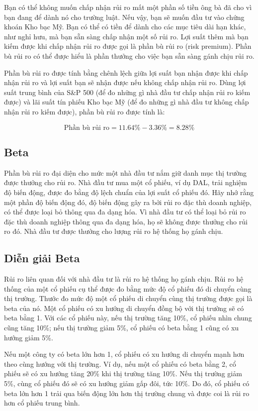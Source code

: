 Bạn có thể không muốn chấp nhận rủi ro mất một phần số tiền ông bà đã cho vì bạn đang để dành nó cho trường luật. Nếu vậy, bạn sẽ muốn đầu tư vào chứng khoán Kho bạc Mỹ. Bạn có thể có tiền để dành cho các mục tiêu dài hạn khác, như nghỉ hưu, mà bạn sẵn sàng chấp nhận một số rủi ro. Lợi suất thêm mà bạn kiếm được khi chấp nhận rủi ro được gọi là phần bù rủi ro (risk premium). Phần bù rủi ro có thể được hiểu là phần thưởng cho việc bạn sẵn sàng gánh chịu rủi ro.

Phần bù rủi ro được tính bằng chênh lệch giữa lợi suất bạn nhận được khi chấp nhận rủi ro và lợi suất bạn sẽ nhận được nếu không chấp nhận rủi ro. Dùng lợi suất trung bình của S\&P 500 (để đo những gì nhà đầu tư chấp nhận rủi ro kiếm được) và lãi suất tín phiếu Kho bạc Mỹ (để đo những gì nhà đầu tư không chấp nhận rủi ro kiếm được), phần bù rủi ro được tính là:

$$
\text{Phần bù rủi ro} = 11.64\% - 3.36\% = 8.28\%
$$

\subsection*{Beta}

Phần bù rủi ro đại diện cho mức một nhà đầu tư nắm giữ danh mục thị trường được thưởng cho rủi ro. Nhà đầu tư mua một cổ phiếu, ví dụ DAL, trải nghiệm độ biến động, được đo bằng độ lệch chuẩn của lợi suất cổ phiếu đó. Hãy nhớ rằng một phần độ biến động đó, độ biến động gây ra bởi rủi ro đặc thù doanh nghiệp, có thể được loại bỏ thông qua đa dạng hóa. Vì nhà đầu tư có thể loại bỏ rủi ro đặc thù doanh nghiệp thông qua đa dạng hóa, họ sẽ không được thưởng cho rủi ro đó. Nhà đầu tư được thưởng cho lượng rủi ro hệ thống họ gánh chịu.

\subsection*{Diễn giải Beta}

Rủi ro liên quan đối với nhà đầu tư là rủi ro hệ thống họ gánh chịu. Rủi ro hệ thống của một cổ phiếu cụ thể được đo bằng mức độ cổ phiếu đó di chuyển cùng thị trường. Thước đo mức độ một cổ phiếu di chuyển cùng thị trường được gọi là beta của nó. Một cổ phiếu có xu hướng di chuyển đồng bộ với thị trường sẽ có beta bằng 1. Với các cổ phiếu này, nếu thị trường tăng 10\%, cổ phiếu nhìn chung cũng tăng 10\%; nếu thị trường giảm 5\%, cổ phiếu có beta bằng 1 cũng có xu hướng giảm 5\%.

Nếu một công ty có beta lớn hơn 1, cổ phiếu có xu hướng di chuyển mạnh hơn theo cùng hướng với thị trường. Ví dụ, nếu một cổ phiếu có beta bằng 2, cổ phiếu sẽ có xu hướng tăng 20\% khi thị trường tăng 10\%. Nếu thị trường giảm 5\%, cùng cổ phiếu đó sẽ có xu hướng giảm gấp đôi, tức 10\%. Do đó, cổ phiếu có beta lớn hơn 1 trải qua biến động lớn hơn thị trường chung và được coi là rủi ro hơn cổ phiếu trung bình.

